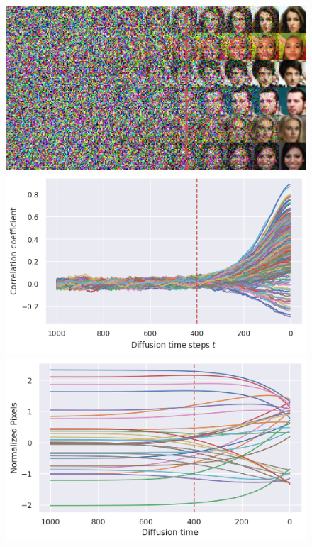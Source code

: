 \begin{figure}[ht!]
\endminipage\hfill
{}
    \includegraphics[width=\linewidth]{figs/imgs/celeba_progressive_generation.png}
\endminipage\hfill
{}
  \includegraphics[width=\linewidth]{figs/plots/celeba_correlation_trajectories.png}
\endminipage\hfill
{}
  \includegraphics[width=\linewidth]{figs/plots/celeba_normalized_trajectories.png}
\endminipage\hfill


\end{figure}
